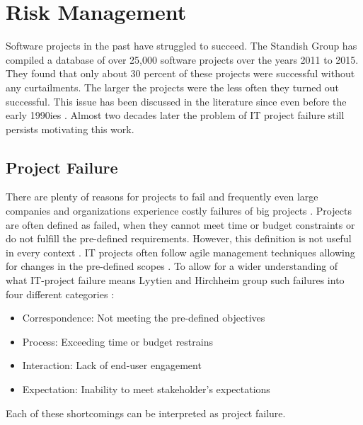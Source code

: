 \section{Risk Management}
\label{sec:theoryA}
Software projects in the past have struggled to succeed. The Standish Group \cite{thestandishgroupinternationalincChaosReport20152015} has compiled a database of over 25,000 software projects over the years 2011 to 2015. They found that only about 30 percent of these projects were successful without any curtailments. The larger the projects were the less often they turned out successful. This issue has been discussed in the literature since even before the early 1990ies \cite{Boehm1991SoftwareRM}. Almost two decades later the problem of IT project failure still persists motivating this work. 

\subsection{Project Failure}
\label{sec:theorAa}
There are plenty of reasons for projects to fail and frequently even large companies and organizations experience costly failures of big projects \cite{dwivediResearchInformationSystems2015}. Projects are often defined as failed, when they cannot meet time or budget constraints or do not fulfill the pre-defined requirements. However, this definition is not useful in every context \cite{debakkerDoesRiskManagement2010}. IT projects often follow agile management techniques allowing for changes in the pre-defined scopes \cite{kusay-merkleAgilesProjektmanagementIm2018}. To allow for a wider understanding of what IT-project failure means Lyytien and Hirchheim group such failures into four different categories \cite{lyytinenInformationSystemsFailures1988}: 
\begin{itemize}
	\item Correspondence: Not meeting the pre-defined objectives
	\item Process: Exceeding time or budget restrains
	\item Interaction: Lack of end-user engagement
	\item Expectation: Inability to meet stakeholder's expectations
\end{itemize}
Each of these shortcomings can be interpreted as project failure.


